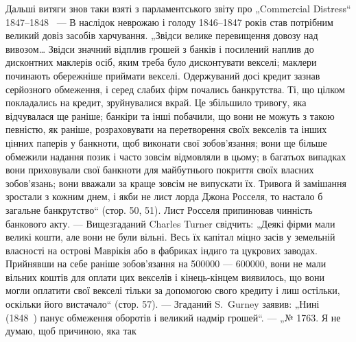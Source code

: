 Дальші витяги знов таки взяті з парламентського звіту про
„Commercial Distress“ 1847--1848~ — В наслідок неврожаю і голоду 1846--1847 років став потрібним
великий довіз засобів харчування. „Звідси велике перевищення довозу над вивозом\dots{} Звідси
значний відплив грошей з банків і посилений наплив до дисконтних маклерів осіб, яким треба було
дисконтувати векселі;
маклери починають обережніше приймати векселі. Одержуваний
досі кредит зазнав серйозного обмеження, і серед слабих фірм
почались банкрутства. Ті, що цілком покладались на кредит,
зруйнувалися вкрай. Це збільшило тривогу, яка відчувалася ще
раніше; банкіри та інші побачили, що вони не можуть з такою
певністю, як раніше, розраховувати на перетворення своїх векселів та інших цінних паперів у
банкноти, щоб виконати свої зобов’язання; вони ще більше обмежили надання позик і часто
зовсім відмовляли в цьому; в багатьох випадках вони приховували свої банкноти для майбутнього
покриття своїх власних зобов’язань; вони вважали за краще зовсім не випускати їх. Тривога
й замішання зростали з кожним днем, і якби не лист лорда
Джона Росселя, то настало б загальне банкрутство“ (стор. 50, 51).
Лист Росселя припинював чинність банкового акту. — Вищезгаданий Charles Turner свідчить: „Деякі
фірми мали великі кошти, але
вони не були вільні. Весь їх капітал міцно засів у земельній
власності на острові Маврікія або в фабриках індиго та цукрових заводах. Прийнявши на себе раніше
зобов’язання на \num{500000} — \num{600000}, вони не мали вільних коштів для
оплати цих векселів і кінець-кінцем виявилось, що вони могли
оплатити свої векселі тільки за допомогою свого кредиту і лиш
остільки, оскільки його вистачало“ (стор. 57). — Згаданий S.~Gurney
заявив: „Нині (1848~) панує обмеження оборотів і великий
надмір грошей“. — „№ 1763. Я не думаю, щоб причиною, яка так
\parbreak{}  %
